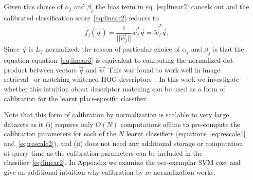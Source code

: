     Given this choice of $\alpha_j$ and $\beta_j$ 
    \textcolor{petr}{
      the bias term in eq. \eqref{eq:linear2} cancels out and
    }
    the calibrated classification score~\eqref{eq:linear2} reduces to
      \begin{align}
        f_j(\vec{q}) = \dfrac{1}{||\vec{w}_j||}\vec{w}_j^T\vec{q} = \vec{\widetilde{w}}_j^T\vec{q}.
        \label{eq:linear3}
      \end{align}
    \textcolor{petr}{
      Since $\vec{q}$ is $L_2$ normalized, the reason of particular choice of $\alpha_j$ and $\beta_j$ is that the equation equation~\eqref{eq:linear3} is equivalent to computing the normalized dot-product between vectors $\vec{q}$ and $\vec{w}$.
    }
    This was found to work well in image retrieval~\cite{Sivic03} or matching whitened HOG descriptors~\cite{Doersch13}.
    In this work we investigate whether this intuition about descriptor matching can be used as a form of calibration for the learnt place-specific classifier. 


    Note  that this form of calibration by normalization is scalable to very large datasets as it (i) requires only $O(N)$ computations offline to pre-compute the calibration parameters for each of the $N$ learnt classifiers (equations~\eqref{eq:rescale1} and~\eqref{eq:rescale2}), and (ii) does not need any additional storage or computation at query time as the calibration parameters can be included in the classifier~\eqref{eq:linear2}. In Appendix we examine the per-exemplar SVM cost and give an additional intuition why calibration by re-normalization works.



